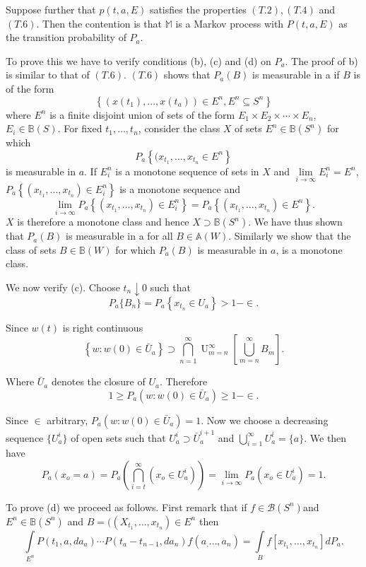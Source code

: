 Suppose further that $p(t,a,E)$ satisfies the properties $(T.2),
(T.4)$ and $(T.6)$. Then the contention is that $\mathbb{M}$ is a
Markov process with $P(t,a,E)$ as the transition probability of
$P_a$. 

To prove this we have to verify conditions (b), (c) and (d) on $P_a$. The
proof of b) is similar to that of $(T.6)$. $(T.6)$ shows that $P_a(B)$
is measurable in a if $B$ is of the form 
$$
\left\{ (x(t_1) , \ldots , x(t_a)) \in E^n, E^n \subseteq S^n \right\} 
$$
where $E^n$ is a finite disjoint union of sets of the form $E_1 \times
E_2 \times \cdots \times E_n$,  $E_i \in \mathbb{B}(S)$. For fixed
$t_1, \ldots , t_n$, consider the class $X$ of sets $E^n \in
\mathbb{B} (S^n)$ for which  
$$
P_a \left\{(x_{t_1}, \ldots , x_{t_n} \in E^n \right\} 
$$
is  measurable  in $a$. If $E^n_i$ is a monotone sequence of sets in $X$
and $\lim\limits_{i \to \infty} E^n_i = E^n$,\pageoriginale 
$P_a  \left\{ (x_{t_1}, \ldots , x_{t_n}) \in  E^n_i \right\}$ 
is a monotone sequence and 
$$
\lim\limits_{i
  \to \infty} P_a \left\{ (x_{t_1}, \ldots , x_{t_n} ) \in E^n_i \right\} = P_a
\left\{ (x_{t_1}, \ldots , x_{t_n}) \in E^n \right\}.
$$  
$X$ is therefore a monotone class and hence $X \supset
\mathbb{B}(S^n)$. We have thus shown that $P_a (B)$ is measurable in a for
all $B \in  \mathbb{A} (W)$. Similarly we show that the class of sets
$B \in \mathbb{B} (W)$ for which $P_a (B)$ is measurable in $a$, is a
monotone class. 

We now verify (c). Choose $t_{n} \downarrow 0$ such that 
$$
P_a \{ B_n \}= P_a \left\{  x_{t_n} \in U_a\right\} > 1 - \in.
$$  

Since $w(t)$ is right continuous
$$
\left\{ w: w (0) \in \bar{U}_a\right\} \supset \bigcap_{n=1}^\infty
\mathop{U}^{\infty}_{m=n} 
  [\bigcup^{\infty}_{m=n} B_{m}]. 
$$

Where $\bar{U}_a$ denotes the closure of $U_a$. Therefore 
$$
1 \ge P_a (w :  w(0) \in  \bar{U}_a ) \ge 1- \in. 
$$

Since $\in$ arbitrary, $P_a (w :w (0) \in \bar{U}_a)=1$. Now we choose
a decreasing sequence $\{ U^i_a\}$ of open sets such that $U^i_a
\supset \bar{U}_a ^{i+1}$ and $\bigcup\limits_{i=1}^\infty U^i_a = \{
a \}$. We then have  
$$
P_a (x_o =a) = P_a ( \bigcap_{i=t}^\infty (x_o \in U^i_a)) = \lim_{i
  \to \infty} P_a (x_o \in U^i_a) =1. 
$$

To prove (d) we proceed as follows. First remark that if  $f \in
\mathscr{B} (S^n)$\pageoriginale and $E^n \in \mathbb{B} (S^n)$ and
$B=  ((X_{t_1},\ldots, x_{t_n}) \in E^n$ then  
$$
\int\limits_{E^n} P(t_1, a, da_a) \cdots P(t_a- t_{n-1}, da_n) f( a_,
\ldots , a_n) = \int\limits_{B} f [x_{t_1} , \ldots , x_{t_n}] dP_a. 
$$

